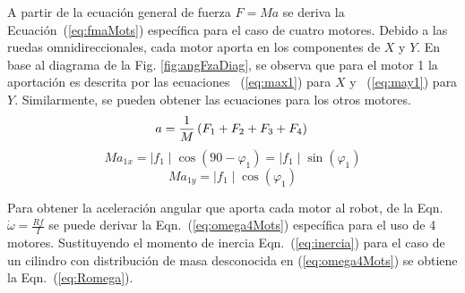 \documentclass[twocolumn,10pt]{amrob}
\begin{document}
A partir de la ecuación general de fuerza \( F = Ma \) se deriva la Ecuación~(\ref{eq:fmaMots}) específica para el caso de cuatro motores. Debido a las ruedas omnidireccionales, cada motor aporta en los componentes de $X$ y $Y$. En base al diagrama de la Fig. \ref{fig:angFzaDiag}, se observa que para el motor 1 la aportación es descrita por las ecuaciones ~(\ref{eq:max1}) para $X$ y ~(\ref{eq:may1}) para $Y$. Similarmente, se pueden obtener las ecuaciones para los otros motores.
\begin{equation}
  a = \frac{1}{M}\left(F_1+F_2+F_3+F_4\right) \label{eq:fmaMots} \\
\end{equation}
\begin{equation}
  Ma_{1x} = \mid f_1 \mid \cos\left(90 - \varphi_1\right) =  \mid f_1 \mid  \sin\left(\varphi_1\right)\label{eq:max1}
\end{equation}
\begin{equation}
  Ma_{1y} = \mid f_1 \mid \cos\left(\varphi_1\right) \label{eq:may1}
\end{equation}

Para obtener la aceleración angular que aporta cada motor al robot, de la Eqn. \(\dot{\omega} = \frac{Rf}{I}\) se puede derivar la Eqn.~(\ref{eq:omega4Mots}) específica para el uso de 4 motores. Sustituyendo el momento de inercia Eqn.~(\ref{eq:inercia}) para el caso de un cilindro con distribución de masa desconocida en (\ref{eq:omega4Mots}) se obtiene la Eqn.~(\ref{eq:Romega}). \par
\end{document}
